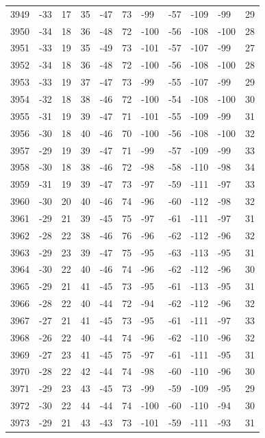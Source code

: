 \begin{table}[H]
\begin{tabular}{lllllllllll}
3949 & -33 & 17 & 35 & -47 & 73 & -99 & -57 & -109 & -99 & 29 \\
3950 & -34 & 18 & 36 & -48 & 72 & -100 & -56 & -108 & -100 & 28 \\
3951 & -33 & 19 & 35 & -49 & 73 & -101 & -57 & -107 & -99 & 27 \\
3952 & -34 & 18 & 36 & -48 & 72 & -100 & -56 & -108 & -100 & 28 \\
3953 & -33 & 19 & 37 & -47 & 73 & -99 & -55 & -107 & -99 & 29 \\
3954 & -32 & 18 & 38 & -46 & 72 & -100 & -54 & -108 & -100 & 30 \\
3955 & -31 & 19 & 39 & -47 & 71 & -101 & -55 & -109 & -99 & 31 \\
3956 & -30 & 18 & 40 & -46 & 70 & -100 & -56 & -108 & -100 & 32 \\
3957 & -29 & 19 & 39 & -47 & 71 & -99 & -57 & -109 & -99 & 33 \\
3958 & -30 & 18 & 38 & -46 & 72 & -98 & -58 & -110 & -98 & 34 \\
3959 & -31 & 19 & 39 & -47 & 73 & -97 & -59 & -111 & -97 & 33 \\
3960 & -30 & 20 & 40 & -46 & 74 & -96 & -60 & -112 & -98 & 32 \\
3961 & -29 & 21 & 39 & -45 & 75 & -97 & -61 & -111 & -97 & 31 \\
3962 & -28 & 22 & 38 & -46 & 76 & -96 & -62 & -112 & -96 & 32 \\
3963 & -29 & 23 & 39 & -47 & 75 & -95 & -63 & -113 & -95 & 31 \\
3964 & -30 & 22 & 40 & -46 & 74 & -96 & -62 & -112 & -96 & 30 \\
3965 & -29 & 21 & 41 & -45 & 73 & -95 & -61 & -113 & -95 & 31 \\
3966 & -28 & 22 & 40 & -44 & 72 & -94 & -62 & -112 & -96 & 32 \\
3967 & -27 & 21 & 41 & -45 & 73 & -95 & -61 & -111 & -97 & 33 \\
3968 & -26 & 22 & 40 & -44 & 74 & -96 & -62 & -110 & -96 & 32 \\
3969 & -27 & 23 & 41 & -45 & 75 & -97 & -61 & -111 & -95 & 31 \\
3970 & -28 & 22 & 42 & -44 & 74 & -98 & -60 & -110 & -96 & 30 \\
3971 & -29 & 23 & 43 & -45 & 73 & -99 & -59 & -109 & -95 & 29 \\
3972 & -30 & 22 & 44 & -44 & 74 & -100 & -60 & -110 & -94 & 30 \\
3973 & -29 & 21 & 43 & -43 & 73 & -101 & -59 & -111 & -93 & 31 \\

\end{tabular}
\end{table}
